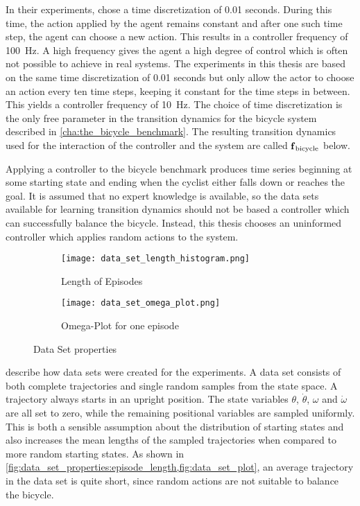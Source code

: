 In their experiments, \citeauthor{randlov_learning_1998} chose a time discretization of 0.01 seconds.
During this time, the action applied by the agent remains constant and after one such time step, the agent can choose a new action.
This results in a controller frequency of \SI[mode=text]{100}{\Hz}.
A high frequency gives the agent a high degree of control which is often not possible to achieve in real systems.
The experiments in this thesis are based on the same time discretization of 0.01 seconds but only allow the actor to choose an action every ten time steps, keeping it constant for the time steps in between.
This yields a controller frequency of \SI[mode=text]{10}{\Hz}.
The choice of time discretization is the only free parameter in the transition dynamics for the bicycle system described in \cref{cha:the_bicycle_benchmark}.
The resulting transition dynamics used for the interaction of the controller and the system are called $\operatorname{\operatorname{\mathbf{f}}_{\text{bicycle}}}$ below.

Applying a controller to the bicycle benchmark produces time series beginning at some starting state and ending when the cyclist either falls down or reaches the goal.
It is assumed that no expert knowledge is available, so the data sets available for learning transition dynamics should not be based a controller which can successfully balance the bicycle.
Instead, this thesis chooses an uninformed controller which applies random actions to the system.

\begin{figure}[t]
    \centering
    \begin{subfigure}{\subfigurewidth}
        \centering
        \texttt{[image: data\_set\_length\_histogram.png]}
        \caption{Length of Episodes}
        \label{fig:data_set_properties:episode_length}
    \end{subfigure}
    \begin{subfigure}{\subfigurewidth}
        \centering
        \texttt{[image: data\_set\_omega\_plot.png]}
        \caption{Omega-Plot for one episode}
        \label{fig:data_set_properties:omega_example}
    \end{subfigure}
    \caption{Data Set properties}
    \label{fig:data_set_properties}
\end{figure}
 describe how data sets were created for the experiments.
A data set consists of both complete trajectories and single random samples from the state space.
A trajectory always starts in an upright position.
The state variables $\theta$, $\dot{\theta}$, $\omega$ and $\dot{\omega}$ are all set to zero, while the remaining positional variables are sampled uniformly.
This is both a sensible assumption about the distribution of starting states and also increases the mean lengths of the sampled trajectories when compared to more random starting states.
As shown in \cref{fig:data_set_properties:episode_length,fig:data_set_plot}, an average trajectory in the data set is quite short, since random actions are not suitable to balance the bicycle.

